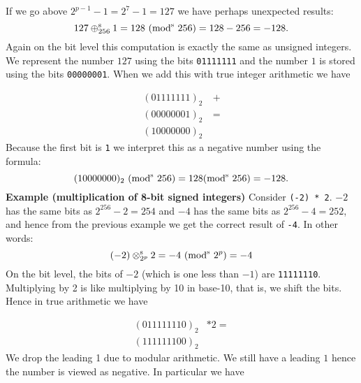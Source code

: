 \begin{example} If we go above $2^{p-1}-1 = 2^7 - 1 = 127$  we have perhaps unexpected results:
\[
127 \ensuremath{\oplus}_{256}^{\rm s} 1 = 128\  ({\rm mod}^{\rm s}\ 256) = 128 - 256 = -128.
\]
Again on the bit level this computation is exactly the same as unsigned integers. We represent the number $127$ using the bits \texttt{01111111} and the  number $1$ is stored using the bits \texttt{00000001}. When we add this with true integer arithmetic we have


\begin{align*}
(01111111)_2 &\ + \\
(00000001)_2 &\ = \\
(10000000)_2&
\end{align*}
Because the first bit is \texttt{1} we interpret this as a negative number using the formula:
\[
(10000000)_2\ ({\rm mod}^{\rm s}\ 256) = 128   ({\rm mod}^{\rm s}\ 256) = -128.
\]
\textbf{Example (multiplication of 8-bit signed integers)} Consider \texttt{(-2) * 2}. $-2$ has the same bits as $2^{256} - 2 = 254$ and $-4$ has the same bits as $2^{256}-4 = 252$, and hence from the previous example we get the correct result of \texttt{-4}. In other words:
\[
(-2) \ensuremath{\otimes}_{2^p}^{\rm s} 2 = -4 \ ({\rm mod}^{\rm s}\ 2^p) = -4
\]
On the bit level, the bits of $-2$ (which is one less than $-1$) are \texttt{11111110}. Multiplying by 2 is like multiplying by 10 in base-10, that is, we shift the bits. Hence in true arithmetic we have


\begin{align*}
(0 11111110)_2 & * 2 = \\
(1 11111100)_2&
\end{align*}
We drop the leading 1 due to modular arithmetic. We still have a leading $1$ hence the number is viewed as negative. In particular we have
\end{example}



